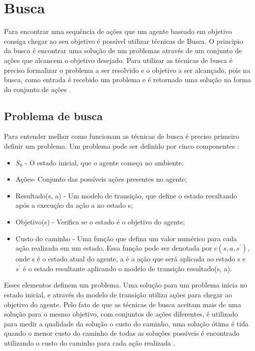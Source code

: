 \chapter{\label{chap:busca}Busca}

Para encontrar uma sequência de ações que um agente baseado em objetivo consiga chegar ao seu objetivo é possível utilizar técnicas de Busca. 
O principio da busca é encontrar uma solução de um problemas através de um conjunto de ações que alcancem o objetivo desejado. 
Para utilizar as técnicas de busca é preciso formalizar o problema a ser resolvido e o objetivo a ser alcançado, pois na busca, como entrada é recebido um problema e é retornado uma solução na forma do conjunto de ações \cite{intelligence2003modern}. 

\section{Problema de busca}

Para entender melhor como funcionam as técnicas de busca é preciso primeiro definir um problema. Um problema pode ser definido por cinco componentes \cite{intelligence2003modern}:
  
\begin{itemize}
	\item $S_{0}$ - O estado inicial, que o agente começa no ambiente;
	\item Ações- Conjunto das possíveis ações presentes no agente;
	\item Resultado(s, a) - Um modelo de transição, que define o estado resultando após a execução da ação a no estado s;
	\item Objetivo(s) - Verifica se o estado é o objetivo do agente;
	\item Custo do caminho - Uma função que defina um valor numérico para cada ação realizada em um estado. Essa função pode ser denotada por $c(s, a, s^{'})$, onde s é o estado atual do agente, a é a ação que será aplicada ao estado s e $s^{'}$ é o estado resultante aplicando o modelo de transição resultado(s, a). 
\end{itemize}   

Esses elementos definem um problema. Uma solução para um problema inicia no estado inicial, e através do modelo de transição utiliza ações para chegar ao objetivo do agente. 
Pelo fato de que as técnicas de busca aceitam mais de uma solução para o mesmo objetivo, com conjuntos de ações diferentes, é utilizado para medir a qualidade da solução o custo do caminho, uma solução ótima é tida quando o menor custo do caminho de todas as soluções possíveis é encontrado utilizando o custo do caminho para cada ação realizada \cite{intelligence2003modern}.

